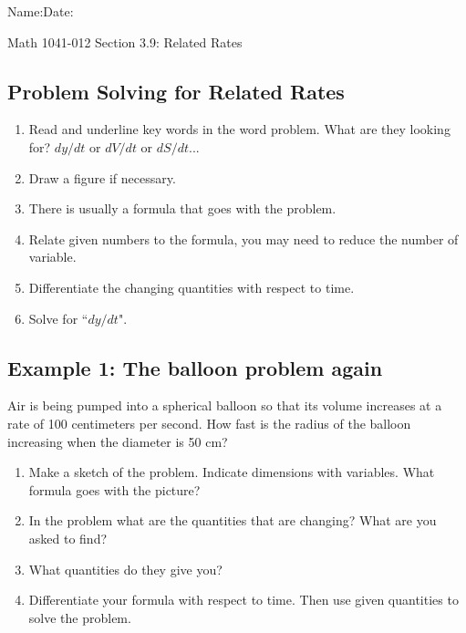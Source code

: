 \documentclass[10pt]{book}
\theoremstyle{definition}
\begin{document}
\begin{flushleft}
Name:\underline{\hspace{13cm}}Date:\underline{\hspace{2cm}}
\end{flushleft}
\begin{center}
{\Large Math 1041-012 \hspace{0.5cm} Section 3.9: Related Rates}
\end{center}

\begin{tcolorbox}
\subsection*{Problem Solving for Related Rates}
\begin{enumerate}
    \item Read and underline key words in the word problem. What are they looking for? $dy/dt$ or $dV/dt$ or $dS/dt$...
    \item Draw a figure if necessary.
    \item There is usually a formula that goes with the problem.
    \item Relate given numbers to the formula, you may need to reduce the number of variable.
    \item Differentiate the changing quantities with respect to time.
    \item Solve for ``$dy/dt$".
\end{enumerate}
\end{tcolorbox}
\subsection*{Example 1: The balloon problem again}
Air is being pumped into a spherical balloon so that its volume increases at a rate of 100 centimeters per second. How fast is the radius of the balloon increasing when the diameter is 50 cm?
\begin{enumerate}[label=(\alph*)]
    \item Make a sketch of the problem. Indicate dimensions with variables. What formula goes with the picture?\vspace{4cm} 
    \item In the problem what are the quantities that are changing? What are you asked to find?\vspace{2cm}
    \item What quantities do they give you?\vspace{2cm}
    \item Differentiate your formula with respect to time. Then use given quantities to solve the problem.
\end{enumerate}
\clearpage
\end{document}
